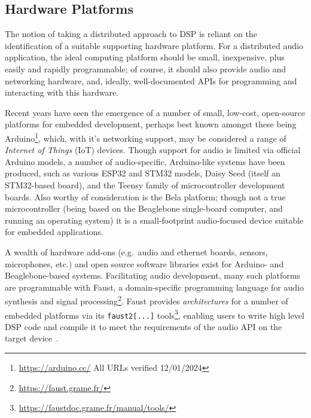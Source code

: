 \subsection{Hardware Platforms}\label{subsec:hardware-platforms}

The notion of taking a distributed approach to DSP is reliant on the
identification of a suitable supporting hardware platform.
For a distributed audio application, the ideal computing platform should be
small, inexpensive, plus easily and rapidly programmable;
of course, it should also provide audio and networking hardware, and, ideally,
well-documented APIs for programming and interacting with this hardware.

Recent years have seen the emergence of a number of small, low-cost, open-source
platforms for embedded development, perhaps best known amongst these being
Arduino\footnote{\url{https://arduino.cc/} \textemdash{} All URLs verified
12/01/2024}, which, with it's networking support, may be considered a range of
\textit{Internet of Things} (IoT) devices.
Though support for audio is limited via official Arduino models, a number of
audio-specific, Arduino-like systems have been produced, such as various
ESP32 and STM32 models, Daisy Seed (itself an STM32-based board), and the Teensy
family of microcontroller development boards.
Also worthy of consideration is the Bela platform; though not a true
microcontroller (being based on the Beaglebone single-board computer, and
running an operating system) it is a small-footprint audio-focused device
suitable for embedded applications.

A wealth of hardware add-ons (e.g.\ audio and ethernet boards, sensors,
microphones, etc.) and open source software libraries exist for Arduino- and
Beaglebone-based systems.
Facilitating audio development, many such platforms are programmable with
Faust, a domain-specific programming language for audio synthesis and signal
processing\footnote{\url{https://faust.grame.fr/}}.
Faust provides \textit{architectures} for a number of embedded platforms via its
\texttt{faust2[...]} tools\footnote{
    \url{https://faustdoc.grame.fr/manual/tools/}
}, enabling users to write high level DSP code and compile it to meet the
requirements of the audio API on the target device~\citep{michon_real_2019,
    michon_embedded_2020}.

